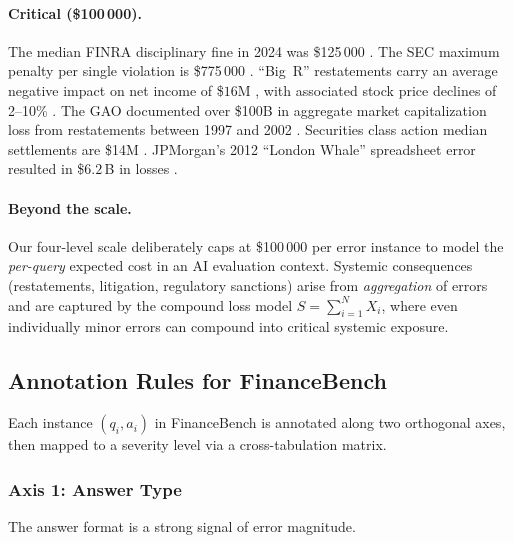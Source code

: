 \paragraph{Critical (\$100\,000).}
The median FINRA disciplinary fine in 2024 was \$125\,000
\citep{eversheds2024finra,csglaw2024}. The SEC maximum penalty per single violation is
\$775\,000 \citep{harvard2016sec}. \enquote{Big~R} restatements carry an
average negative impact on net income of \$$16$M
\citep{accountingtoday2024,auditanalytics2020,acito2019restatements},
with associated stock price declines of 2--10\% \citep{gleason2008contagion}.
The GAO documented over \$100B in aggregate market capitalization loss
from restatements between 1997 and 2002 \citep{gao2003}. Securities
class action median settlements are \$14M
\citep{cornerstone2024scasettlement,cornerstone2024,finnerty2006sca}. JPMorgan's 2012 \enquote{London Whale} spreadsheet
error resulted in \$$6.2$\,B in losses
\citep{senate2013whale,prosperspark2023}.

\paragraph{Beyond the scale.}
Our four-level scale deliberately caps at \$100\,000 per error instance
to model the \emph{per-query} expected cost in an AI evaluation context.
Systemic consequences (restatements, litigation, regulatory sanctions)
arise from \emph{aggregation} of errors and are captured by the compound
loss model $S = \sum_{i=1}^{N} X_i$, where even individually minor
errors can compound into critical systemic exposure.

\subsection{Annotation Rules for FinanceBench}
\label{sec:annotation-rules}

Each instance $(q_i, a_i)$ in FinanceBench is annotated along two
orthogonal axes, then mapped to a severity level via a cross-tabulation
matrix.

\subsubsection{Axis 1: Answer Type}
\label{sec:answer-type}

The answer format is a strong signal of error magnitude.

